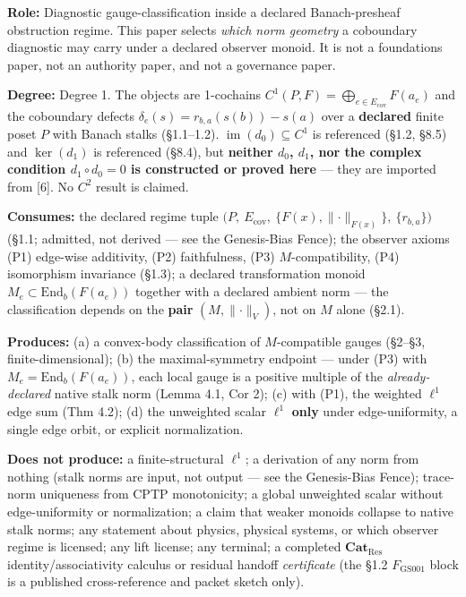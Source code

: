 \documentclass[
  11pt,
]{article}
\begin{document}
\textbf{Role:} Diagnostic gauge-classification inside a declared Banach-presheaf obstruction regime. This paper selects \emph{which norm geometry} a coboundary diagnostic may carry under a declared observer monoid. It is not a foundations paper, not an authority paper, and not a governance paper.

\textbf{Degree:} Degree 1. The objects are 1-cochains \(C^1(P,F)=\bigoplus_{e\in E_{\mathrm{cov}}}F(a_e)\) and the coboundary defects \(\delta_e(s)=r_{b,a}(s(b))-s(a)\) over a \textbf{declared} finite poset \(P\) with Banach stalks (§1.1--1.2). \(\operatorname{im}(d_0)\subseteq C^1\) is referenced (§1.2, §8.5) and \(\ker(d_1)\) is referenced (§8.4), but \textbf{neither \(d_0\), \(d_1\), nor the complex condition \(d_1\circ d_0=0\) is constructed or proved here} --- they are imported from {[}6{]}. No \(C^2\) result is claimed.

\textbf{Consumes:} the declared regime tuple \(\bigl(P,\ E_{\mathrm{cov}},\ \{F(x),\lVert\cdot\rVert_{F(x)}\},\ \{r_{b,a}\}\bigr)\) (§1.1; admitted, not derived --- see the Genesis-Bias Fence); the observer axioms (P1) edge-wise additivity, (P2) faithfulness, (P3) \(M\)-compatibility, (P4) isomorphism invariance (§1.3); a declared transformation monoid \(M_e\subset\mathrm{End}_b(F(a_e))\) together with a declared ambient norm --- the classification depends on the \textbf{pair} \((M,\lVert\cdot\rVert_V)\), not on \(M\) alone (§2.1).

\textbf{Produces:} (a) a convex-body classification of \(M\)-compatible gauges (§2--§3, finite-dimensional); (b) the maximal-symmetry endpoint --- under (P3) with \(M_e=\mathrm{End}_b(F(a_e))\), each local gauge is a positive multiple of the \emph{already-declared} native stalk norm (Lemma 4.1, Cor 2); (c) with (P1), the weighted \(\ell^1\) edge sum (Thm 4.2); (d) the unweighted scalar \(\ell^1\) \textbf{only} under edge-uniformity, a single edge orbit, or explicit normalization.

\textbf{Does not produce:} a finite-structural \(\ell^1\); a derivation of any norm from nothing (stalk norms are input, not output --- see the Genesis-Bias Fence); trace-norm uniqueness from CPTP monotonicity; a global unweighted scalar without edge-uniformity or normalization; a claim that weaker monoids collapse to native stalk norms; any statement about physics, physical systems, or which observer regime is licensed; any lift license; any terminal; a completed \(\mathbf{Cat}_{\mathrm{Res}}\) identity/associativity calculus or residual handoff \emph{certificate} (the §1.2 \(F_{\mathrm{GS001}}\) block is a published cross-reference and packet sketch only).
\end{document}
